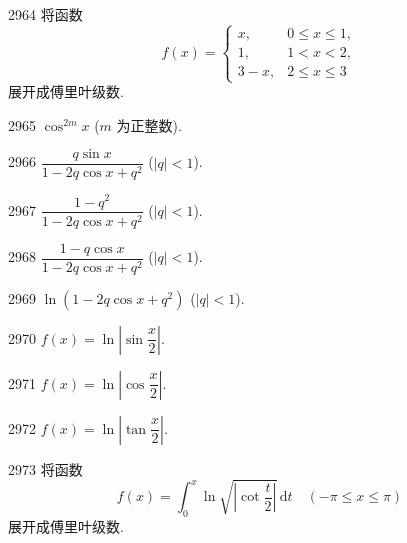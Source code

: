 \begin{prob}[M]{2964}
将函数
\[
f(x) = \begin{cases}
x, & 0 \leqslant x \leqslant 1, \\
1, & 1 < x < 2, \\
3 - x, & 2 \leqslant x \leqslant 3
\end{cases}
\]
展开成傅里叶级数.
\end{prob}


\begin{prob}[S]{2965}
$\cos^{2m} x$ ($m$ 为正整数).
\end{prob}

\begin{prob}[S]{2966}
$\dfrac{q\sin x}{1 - 2q\cos x + q^2}$ ($|q| < 1$).
\end{prob}

\begin{prob}[S]{2967}
$\dfrac{1 - q^2}{1 - 2q\cos x + q^2}$ ($|q| < 1$).
\end{prob}

\begin{prob}[S]{2968}
$\dfrac{1 - q\cos x}{1 - 2q\cos x + q^2}$ ($|q| < 1$).
\end{prob}

\begin{prob}[S]{2969}
$\ln(1 - 2q\cos x + q^2)$ ($|q| < 1$).
\end{prob}


\begin{prob}[S]{2970}
$f(x) = \ln\left|\sin\dfrac{x}{2}\right|$.
\end{prob}

\begin{prob}[S]{2971}
$f(x) = \ln\left|\cos\dfrac{x}{2}\right|$.
\end{prob}

\begin{prob}[S]{2972}
$f(x) = \ln\left|\tan\dfrac{x}{2}\right|$.
\end{prob}

\begin{prob}[M]{2973}
将函数
\[
f(x) = \int_0^x \ln\sqrt{\left|\cot\frac{t}{2}\right|}\,\mathrm{d}t \quad (-\pi \leqslant x \leqslant \pi)
\]
展开成傅里叶级数.
\end{prob}

